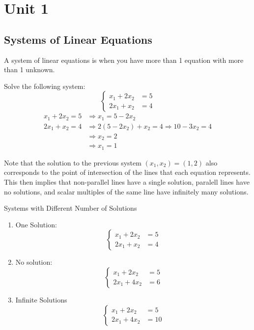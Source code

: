 \section{Unit 1}
\subsection{Systems of Linear Equations}

A system of linear equations is when you have more than 1 equation with more than 1 unknown.

\begin{example}{}{}
    Solve the following system:
    \[
        \begin{cases}
            x_1 + 2x_2 &= 5 \\
            2x_1 + x_2 &= 4
        \end{cases}
    \]
    \begin{align*}
        x_1 + 2x_2 = 5 &\Rightarrow x_1 = 5-2x_2 \\
        2x_1 + x_2 = 4 &\Rightarrow 2(5-2x_2) + x_2 = 4 \Rightarrow 10-3x_2=4 \\ 
        &\Rightarrow x_2=2 \\
        &\Rightarrow x_1 = 1
    \end{align*}
\end{example}

Note that the solution to the previous system $(x_1, x_2) = (1, 2)$ also corresponds to the point of intersection of the lines that each equation represents. This then implies that non-parallel lines have a single solution, paralell lines have no solutions, and scalar multiples of the same line have infinitely many solutions.

\begin{example}{Systems with Different Number of Solutions}{}
    \begin{enumerate}
        \item One Solution:
        \[
            \begin{cases}
                x_1 + 2x_2 &= 5 \\
                2x_1 + x_2 &= 4
            \end{cases} 
        \]

        \item No solution:
        \[
            \begin{cases}
                x_1 + 2x_2 &= 5 \\
                2x_1 + 4x_2 &= 6
            \end{cases}
        \]

        \item Infinite Solutions
        \[
            \begin{cases}
                x_1 + 2x_2 &= 5 \\
                2x_1 + 4x_2 &= 10
            \end{cases}
        \]
    \end{enumerate}
\end{example}

